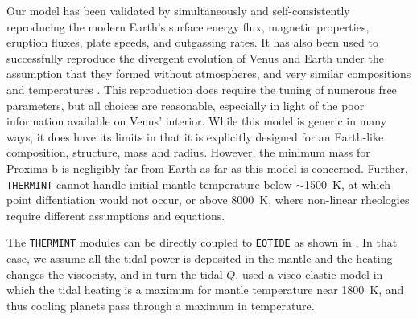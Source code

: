 \documentclass[preprint,12pt]{aastex}
\def\eqtide{\texttt{\footnotesize{EQTIDE}}\xspace}
\def\thermint{\texttt{\footnotesize{THERMINT}}\xspace}
\begin{document}
Our model has been validated by simultaneously and self-consistently
reproducing the modern Earth's surface energy flux, magnetic
properties, eruption fluxes, plate speeds, and outgassing rates. It
has also been used to successfully reproduce the divergent evolution
of Venus and Earth under the assumption that they formed without
atmospheres, and very similar compositions and temperatures
\citep{DriscollBercovici13}. This reproduction does require the tuning of
numerous free parameters, but all choices are reasonable, especially
in light of the poor information available on Venus' interior. While
this model is generic in many ways, it does have its limits in that it is
explicitly designed for an Earth-like composition, structure, mass and
radius. However, the minimum mass for Proxima b is negligibly far from
Earth as far as this model is concerned. Further, \thermint cannot
handle initial mantle temperature below $\sim$1500~K, at which point
diffentiation would not occur, or above 8000~K, where non-linear
rheologies require different assumptions and equations.

The \thermint modules can be directly coupled to \eqtide as shown in
\citep{DriscollBarnes15}. In that case, we assume all the tidal power
is deposited in the mantle and the heating changes the viscocisty, and
in turn the tidal $Q$. \cite{DriscollBarnes15} used a visco-elastic
model in which the tidal heating is a maximum for mantle temperature
near 1800~K, and thus cooling planets pass through a maximum in
temperature.
\end{document}
